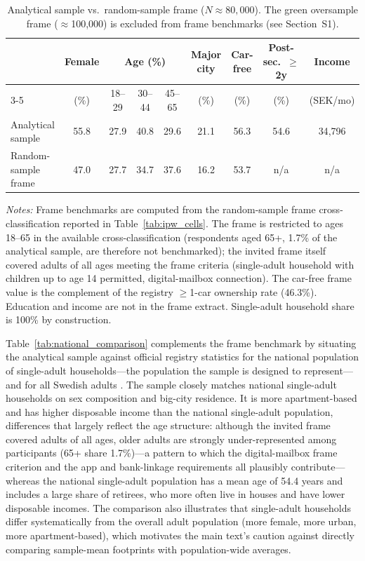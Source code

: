 \documentclass[12pt]{article}
\begin{document}
\begin{table}[!htbp]
\centering
\footnotesize
\caption{Analytical sample vs.\ random-sample frame ($N\approx 80{,}000$). The
green oversample frame ($\approx$100{,}000) is excluded from frame benchmarks
(see Section~S1).}
\label{tab:benchmarking}
\begin{tabular}{lcccccccc}
\toprule
 & Female & \multicolumn{3}{c}{Age (\%)} & Major city & Car-free & Post-sec.\ $\geq$2y & Income \\
\cmidrule(lr){3-5}
 & (\%) & 18--29 & 30--44 & 45--65 & (\%) & (\%) & (\%) & (SEK/mo) \\
\midrule
Analytical sample   & 55.8 & 27.9 & 40.8 & 29.6 & 21.1 & 56.3 & 54.6 & 34{,}796 \\
Random-sample frame & 47.0 & 27.7 & 34.7 & 37.6 & 16.2 & 53.7 & n/a  & n/a \\
\bottomrule
\end{tabular}

\smallskip
{\footnotesize\raggedright
\textit{Notes:} Frame benchmarks are computed from the random-sample frame
cross-classification reported in Table~\ref{tab:ipw_cells}. The frame is
restricted to ages 18--65 in the available cross-classification (respondents aged 65+, 1.7\% of the analytical sample, are therefore not benchmarked); the invited frame itself covered adults of all ages meeting the frame criteria (single-adult household with children up to age 14 permitted, digital-mailbox connection). The car-free frame value is the complement of the registry $\geq$1-car ownership rate (46.3\%). Education and income are not in the frame extract. Single-adult household share is 100\% by construction.\par}
\end{table}

Table~\ref{tab:national_comparison} complements the frame benchmark by situating the analytical sample against official registry statistics for the national population of single-adult households---the population the sample is designed to represent---and for all Swedish adults \citep{scb_statdb_2024}. The sample closely matches national single-adult households on sex composition and big-city residence. It is more apartment-based and has higher disposable income than the national single-adult population, differences that largely reflect the age structure: although the invited frame covered adults of all ages, older adults are strongly under-represented among participants (65+ share 1.7\%)---a pattern to which the digital-mailbox frame criterion and the app and bank-linkage requirements all plausibly contribute---whereas the national single-adult population has a mean age of 54.4 years and includes a large share of retirees, who more often live in houses and have lower disposable incomes. The comparison also illustrates that single-adult households differ systematically from the overall adult population (more female, more urban, more apartment-based), which motivates the main text's caution against directly comparing sample-mean footprints with population-wide averages.
\end{document}
